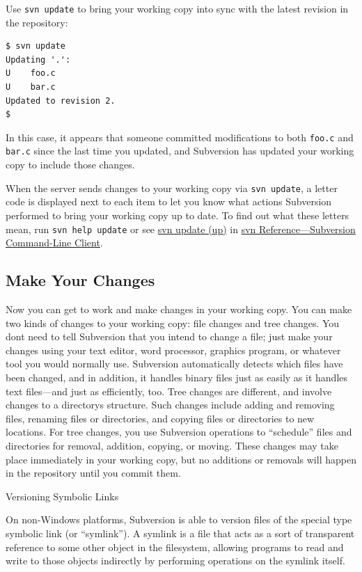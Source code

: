 Use \texttt{svn\ update} to bring your working copy into sync with the
latest revision in the repository:

\begin{verbatim}
$ svn update
Updating '.':
U    foo.c
U    bar.c
Updated to revision 2.
$
\end{verbatim}

In this case, it appears that someone committed modifications to both
\texttt{foo.c} and \texttt{bar.c} since the last time you updated, and
Subversion has updated your working copy to include those changes.

When the server sends changes to your working copy via
\texttt{svn\ update}, a letter code is displayed next to each item to
let you know what actions Subversion performed to bring your working
copy up to date. To find out what these letters mean, run
\texttt{svn\ help\ update} or see \hyperref[svn.ref.svn.c.update]{svn
update (up)} in \hyperref[svn.ref.svn]{svn Reference---Subversion
Command-Line Client}.

\subsection{Make Your Changes}\label{svn.tour.cycle.edit}

Now you can get to work and make changes in your working copy. You can
make two kinds of changes to your working copy: file changes and tree
changes. You don\textquotesingle t need to tell Subversion that you
intend to change a file; just make your changes using your text editor,
word processor, graphics program, or whatever tool you would normally
use. Subversion automatically detects which files have been changed, and
in addition, it handles binary files just as easily as it handles text
files---and just as efficiently, too. Tree changes are different, and
involve changes to a directory\textquotesingle s structure. Such changes
include adding and removing files, renaming files or directories, and
copying files or directories to new locations. For tree changes, you use
Subversion operations to ``schedule'' files and directories for removal,
addition, copying, or moving. These changes may take place immediately
in your working copy, but no additions or removals will happen in the
repository until you commit them.

Versioning Symbolic Links

On non-Windows platforms, Subversion is able to version files of the
special type symbolic link (or ``symlink''). A symlink is a file that
acts as a sort of transparent reference to some other object in the
filesystem, allowing programs to read and write to those objects
indirectly by performing operations on the symlink itself.

